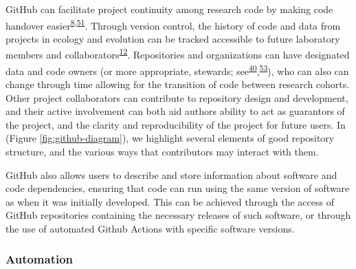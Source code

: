 GitHub can facilitate project continuity among research code by making code handover easier\textsuperscript{\protect\hyperlink{ref-4ny1onB0}{8},\protect\hyperlink{ref-D4C4k4ak}{51}}.
Through version control, the history of code and data from projects in ecology and evolution can be tracked accessible to future laboratory members and collaborators\textsuperscript{\protect\hyperlink{ref-3DKwn1sY}{12}}.
Repositories and organizations can have designated data and code owners (or more appropriate, stewards; see\textsuperscript{\protect\hyperlink{ref-iIEKCTLU}{40}},\textsuperscript{\protect\hyperlink{ref-s91uGRZ2}{53}}), who can also can change through time allowing for the transition of code between research cohorts.
Other project collaborators can contribute to repository design and development, and their active involvement can both aid authors ability to act as guarantors of the project, and the clarity and reproducibility of the project for future users.
In (Figure \ref{fig:github-diagram}), we highlight several elements of good repository structure, and the various ways that contributors may interact with them.

GitHub also allows users to describe and store information about software and code dependencies, ensuring that code can run using the same version of software as when it was initially developed.
This can be achieved through the access of GitHub repositories containing the necessary releases of such software, or through the use of automated Github Actions with specific software versions.

\hypertarget{automation}{%
\subsubsection{Automation}\label{automation}}

